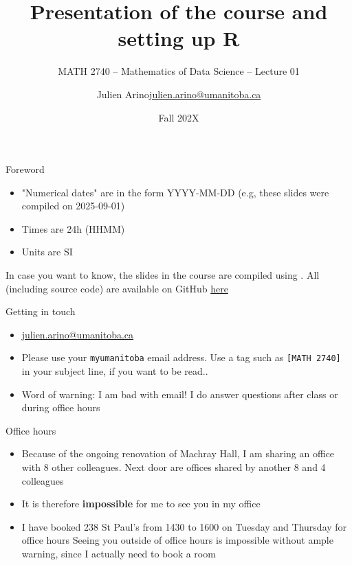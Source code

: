 \documentclass[aspectratio=169]{beamer}\usepackage[]{graphicx}\usepackage[]{xcolor}
\subtitle{MATH 2740 -- Mathematics of Data Science -- Lecture 01}
\author{\texorpdfstring{Julien Arino\newline\url{julien.arino@umanitoba.ca}}{Julien Arino}}
\institute{Department of Mathematics @ University of Manitoba}
\date{Fall 202X}
\title{Presentation of the course and setting up R}
\begin{document}



\begin{frame}{Foreword}
\begin{itemize}
\item "Numerical dates" are in the form YYYY-MM-DD (e.g, these slides were compiled on 2025-09-01)
\vfill
\item Times are 24h (HHMM)
\vfill
\item Units are SI
\end{itemize}
\vfill
In case you want to know, the slides in the course are  compiled using . All (including source code) are available on GitHub \href{https://github.com/julien-arino/math2740-of-data-science}{here}
\end{frame}

\begin{frame}{Getting in touch}
\begin{itemize}
\item \href{mailto:julien.arino@umanitoba.ca}{julien.arino@umanitoba.ca}
\vfill
\item Please use your \texttt{myumanitoba} email address. Use a tag such as \texttt{[MATH 2740]} in your subject line, if you want to be read..
\vfill
\item Word of warning: I am bad with email! I do answer questions after class or during office hours
\end{itemize}
\end{frame}

\begin{frame}{Office hours}
\begin{itemize}
\item Because of the ongoing renovation of Machray Hall, I am sharing an office with 8 other colleagues. Next door are offices shared by another 8 and 4 colleagues
\vfill
\item It is therefore \textbf{impossible} for me to see you in my office
\vfill
\item I have booked 238 St Paul's from 1430 to 1600 on Tuesday and Thursday for office hours
\vfill
Seeing you outside of office hours is impossible without ample warning, since I actually need to book a room
\end{itemize}
\end{frame}
\end{document}
